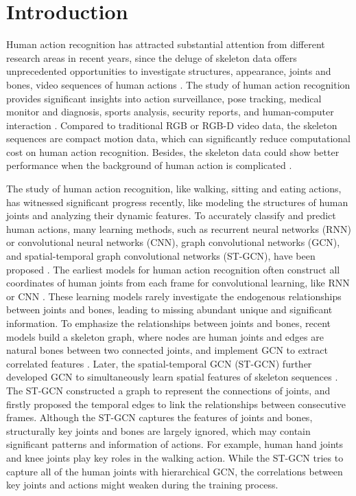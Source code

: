 \documentclass[runningheads]{llncs}
\begin{document}
\section{Introduction}

Human action recognition has attracted substantial attention from different research areas in recent years, since the deluge of skeleton data offers unprecedented opportunities to investigate structures, appearance,  joints and bones, video sequences of human actions \cite{yan2018spatial,song2017end,zhang2017view,li2018co}. The study of human action recognition provides significant insights into action surveillance, pose tracking, medical monitor and diagnosis, sports analysis, security reports, and human-computer interaction \cite{tuttle2017natural,sultani2018real,andriluka2018,hosny2018artificial,chen2019sports,athalye2018robustness,chakraborty2017review}. Compared to traditional RGB or RGB-D video data, the skeleton sequences are compact motion data, which can significantly reduce computational cost on human action recognition. Besides, the skeleton data could show better performance when the background of human action is complicated \cite{jiang2017broadband,yan2018spatial,xie2018memory}. 

The study of human action recognition, like walking, sitting and eating actions, has witnessed significant progress recently, like modeling the structures of human joints and analyzing their dynamic features. To accurately classify and predict human actions, many learning methods, such as recurrent neural networks (RNN) or convolutional neural networks (CNN), graph convolutional networks (GCN), and spatial-temporal graph convolutional networks (ST-GCN), have been proposed \cite{graves2013speech,krizhevsky2012imagenet,yan2018spatial}.  The earliest models for human action recognition often construct all coordinates of human joints from each frame for convolutional learning, like RNN or CNN \cite{graves2013speech,krizhevsky2012imagenet}. These learning models rarely investigate the endogenous relationships between joints and bones, leading to missing abundant unique and significant information. To emphasize the relationships between joints and bones, recent models build a skeleton graph, where nodes are human joints and edges are natural bones between two connected joints, and implement GCN to extract correlated features \cite{kipf2016semi}. Later, the spatial-temporal GCN (ST-GCN) further developed GCN to simultaneously learn spatial features of skeleton sequences \cite{yan2018spatial}. The ST-GCN constructed a graph to represent the connections of joints, and firstly proposed the temporal edges to link the relationships between consecutive frames. Although the ST-GCN captures the features of joints and bones, structurally key joints and bones are largely ignored, which may contain significant patterns and information of actions. For example, human hand joints and knee joints play key roles in the walking action. While the ST-GCN tries to capture all of the human joints with hierarchical GCN, the correlations between key joints and actions might weaken during the training process. 
\end{document}
